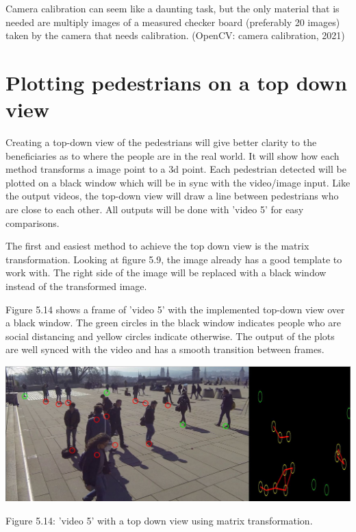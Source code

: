 \documentclass[12pt]{report}
\begin{document}
Camera calibration can seem like a daunting task, but the only material that is needed are multiply images of a measured checker board (preferably 20 images) taken by the camera that needs calibration. (OpenCV: camera calibration, 2021)

\section{Plotting pedestrians on a top down view}

Creating a top-down view of the pedestrians will give better clarity to the beneficiaries as to where the people are in the real world. It will show how each method transforms a image point to a 3d point. Each pedestrian detected will be plotted on a black window which will be in sync with the video/image input. Like the output videos, the top-down view will draw a line between pedestrians who are close to each other. All outputs will be done with 'video 5' for easy comparisons.

\vspace{2mm}

The first and easiest method to achieve the top down view is the matrix transformation. Looking at figure 5.9, the image already has a good template to work with. The right side of the image will be replaced with a black window instead of the transformed image.

\vspace{2mm}

Figure 5.14 shows a frame of 'video 5' with the implemented top-down view over a black window. The green circles in the black window indicates people who are social distancing and yellow circles indicate otherwise. The output of the plots are well synced with the video and has a smooth transition between frames.
\begin{center}
	\includegraphics[width=150mm]{./images/appendix/BlackBoxMatrixTransformation.JPG}
	
	{\footnotesize Figure 5.14: 'video 5' with a top down view using matrix transformation.}
\end{center}
\end{document}

